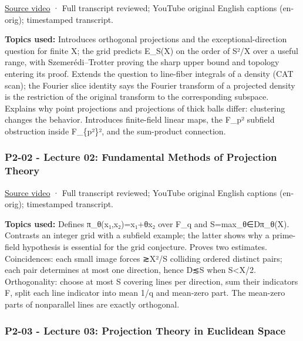 \href{https://www.youtube.com/watch?v=1A1kWkxK3QY}{Source video} · Full transcript reviewed; YouTube original English captions (en-orig); timestamped transcript.

\textbf{Topics used:} Introduces orthogonal projections and the exceptional-direction question for finite X; the grid predicts \textbar E\_S(X)\textbar{} on the order of S²/\textbar X\textbar{} over a useful range, with Szemerédi--Trotter proving the sharp upper bound and topology entering its proof. Extends the question to line-fiber integrals of a density (CAT scan); the Fourier slice identity says the Fourier transform of a projected density is the restriction of the original transform to the corresponding subspace. Explains why point projections and projections of thick balls differ: clustering changes the behavior. Introduces finite-field linear maps, the F\_p² subfield obstruction inside F\_\{p²\}², and the sum-product connection.

\subsubsection{P2-02 - Lecture 02: Fundamental Methods of Projection Theory}\label{04-visual-computing-ii-ch036-p2-02---lecture-02-fundamental-methods-of-projection-theory}

\href{https://www.youtube.com/watch?v=sEZHGMV2LiI}{Source video} · Full transcript reviewed; YouTube original English captions (en-orig); timestamped transcript.

\textbf{Topics used:} Defines π\_θ(x₁,x₂)=x₁+θx₂ over F\_q and S=max\_θ∈D\textbar π\_θ(X)\textbar. Contrasts an integer grid with a subfield example; the latter shows why a prime-field hypothesis is essential for the grid conjecture. Proves two estimates. Coincidences: each small image forces ≳\textbar X\textbar²/S colliding ordered distinct pairs; each pair determines at most one direction, hence \textbar D\textbar≲S when S\textless\textbar X\textbar/2. Orthogonality: choose at most S covering lines per direction, sum their indicators F, split each line indicator into mean 1/q and mean-zero part. The mean-zero parts of nonparallel lines are exactly orthogonal.

\subsubsection{P2-03 - Lecture 03: Projection Theory in Euclidean Space}\label{04-visual-computing-ii-ch036-p2-03---lecture-03-projection-theory-in-euclidean-space}

